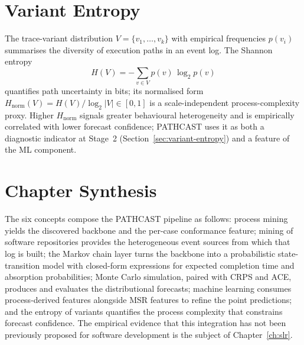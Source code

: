 \section{Variant Entropy}
\label{sec:variant-entropy-cap2}

The trace-variant distribution $V = \{v_1, \ldots, v_k\}$ with empirical
frequencies $p(v_i)$ summarises the diversity of execution paths in an
event log. The Shannon entropy
\begin{equation}
\label{eq:variant-entropy-cap2}
H(V) = - \sum_{v \in V} p(v)\, \log_2 p(v)
\end{equation}
quantifies path uncertainty in bits; its normalised form
$H_{\text{norm}}(V) = H(V) / \log_2 |V| \in [0,1]$ is a scale-independent
process-complexity proxy. Higher $H_{\text{norm}}$ signals greater
behavioural heterogeneity and is empirically correlated with lower
forecast confidence; PATHCAST uses it as both a diagnostic indicator at
Stage~2 (Section~\ref{sec:variant-entropy}) and a feature of the ML
component.


\section{Chapter Synthesis}
\label{sec:ch2-synthesis}

The six concepts compose the PATHCAST pipeline as follows: process mining
yields the discovered backbone and the per-case conformance feature;
mining of software repositories provides the heterogeneous event sources
from which that log is built; the Markov chain layer turns the backbone
into a probabilistic state-transition model with closed-form expressions
for expected completion time and absorption probabilities; Monte Carlo
simulation, paired with CRPS and ACE, produces and evaluates the
distributional forecasts; machine learning consumes process-derived
features alongside MSR features to refine the point predictions; and the
entropy of variants quantifies the process complexity that constrains
forecast confidence. The empirical evidence that this integration has not
been previously proposed for software development is the subject of
Chapter~\ref{ch:slr}.
